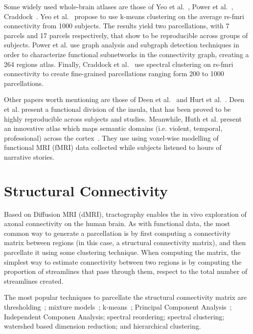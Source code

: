 Some widely used whole-brain atlases are those of Yeo et al.~\cite{Yeo2011},
Power et al.~\cite{Power2011}, Craddock~\cite{Craddock2011}. 
Yeo et al.~\cite{Yeo2011} propose to use k-means clustering on the average
rs-fmri connectivity from 1000 subjects. The results yield two parcellations,
with 7 parcels and 17 parcels respectively, that show to be reproducible across
groups of subjects. Power et al.\cite{Power2011} use graph analysis and subgraph
detection techniques in order to characterize functional subnetworks in the
connectivity graph, creating a 264 regions atlas. Finally, Craddock et al.~\cite{Craddock2011}
use spectral clustering on rs-fmri connectivity to create fine-grained parcellations
ranging form 200 to 1000 parcellations.

Other papers worth mentioning are those of Deen et al.~\cite{Deen2011} and Hurt
et al.~\cite{Huth2016}. Deen et al.\cite{Deen2011} present a functional division
of the insula, that has been proved to be highly reproducible across subjects
and studies. Meanwhile, Huth et al. present an innovative atlas which maps semantic
domains (i.e. violent, temporal, professional) across the cortex~\cite{Huth2016}.
They use using voxel-wise modelling of functional MRI (fMRI) data collected while 
subjects listened to hours of narrative stories.


\section{Structural Connectivity}
\label{sec:structural}
Based on Diffusion MRI (dMRI), tractography enables the in vivo exploration of
axonal connectivity on the human brain. As with functional data, the most
common way to generate a parcellation is by first computing a connectivity matrix
between regions (in this case, a structural connectivity matrix), and then parcellate it using
some clustering technique. When computing the matrix, the simplest way to estimate
connectivity between two regions is by computing the proportion of streamlines
that pass through them, respect to the total number of streamlines created.

The most popular techniques to parcellate the structural connectivity matrix
are thresholding~\cite{Behrens2003}; mixture models~\cite{Jbabdi2009, Clarkson2010, Paristot2015};
k-means~\cite{Anwander2006}; Principal Component Analysis~\cite{ThiebautdeSchotten2014, ThiebautdeSchotten2016};
Independent Componen Analysis\cite{Muircheartaigh2018}; spectral reordering\cite{Bajada2017}; spectral clustering\cite{Fan2016};
watershed based dimension reduction\cite{Roca2009, Lefranc2016}; and hierarchical clustering\cite{Moreno-Dominguez2014, Gallardo2017a}.

